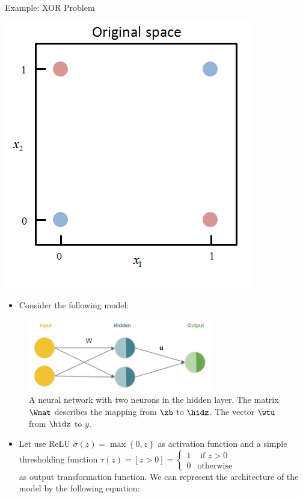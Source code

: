 \begin{vbframe}{Example: XOR Problem}
\begin{minipage}{0.45\textwidth}
\begin{itemize}
    \end{itemize}
  \end{minipage}
  \begin{minipage}{0.5\textwidth}
    \includegraphics{figure/xor1.png}%
  \end{minipage}\hfill
\framebreak
  \begin{itemize}
    \item Consider the following model:
  \end{itemize}
    \begin{figure}
      \centering
        \includegraphics[width=8cm]{figure/xor_rep.png}%
        \caption{A neural network with two neurons in the hidden layer. The matrix $\Wmat$ describes the mapping from $\xb$ to $\hidz$. The vector $\wtu$ from $\hidz$ to $y$.}
    \end{figure}
\framebreak
  \begin{itemize}
    \item Let use ReLU $\sigma(z) = \max\left\{0, z \right\}$ as activation function and a simple thresholding function $\tau(z) = [ z > 0 ] =  \begin{cases} 1 & \text{ if } z > 0 \\ 0 & \text{otherwise} \end{cases} $ \\ as output transformation function. We can represent the architecture of the model by the following equation: 

\end{itemize}
\end{vbframe}
